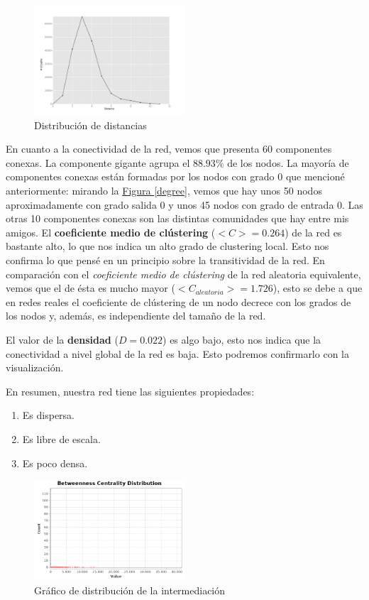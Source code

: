 \documentclass[10pt,a4paper,spanish]{article}
\numberwithin{equation}{section} %
\numberwithin{figure}{section} %
\numberwithin{table}{section} %
\begin{document}
\begin{figure}
    \centering
    \includegraphics[width=0.5\textwidth]{dist_hist}
    \caption{Distribución de distancias}
    \label{dist}
\end{figure}

En cuanto a la conectividad de la red, vemos que presenta 60 componentes conexas. La componente gigante agrupa el $88.93\%$ de los nodos. La mayoría de componentes conexas están formadas por los nodos con grado 0 que mencioné anteriormente: mirando la \hyperref[degree]{Figura \ref*{degree}}, vemos que hay unos 50 nodos aproximadamente con grado salida 0 y unos 45 nodos con grado de entrada 0. Las otras 10 componentes conexas son las distintas comunidades que hay entre mis amigos. El \textbf{coeficiente medio de clústering} ($<C> = 0.264$) de la red es bastante alto, lo que nos indica un alto grado de clustering local. Esto nos confirma lo que pensé en un principio sobre la transitividad de la red. En comparación con el \textit{coeficiente medio de clústering} de la red aleatoria equivalente, vemos que el de ésta es mucho mayor ($<C_{aleatoria}> = 1.726$), esto se debe a que en redes reales el coeficiente de clústering de un nodo decrece con los grados de los nodos y, además, es independiente del tamaño de la red.

El valor de la \textbf{densidad} ($D = 0.022$) es algo bajo, esto nos indica que la conectividad a nivel global de la red es baja. Esto podremos confirmarlo con la visualización.


En resumen, nuestra red tiene las siguientes propiedades:

\begin{enumerate}
    \item Es dispersa.
    \item Es libre de escala.
    \item Es poco densa.
    
\end{enumerate}

\begin{figure}[!h]
    \centering
    \includegraphics[width=0.5\textwidth]{distance-report/Betweenness-Centrality-Distribution}
    \caption{Gráfico de distribución de la intermediación}
    \label{bet}
\end{figure}
\end{document}
